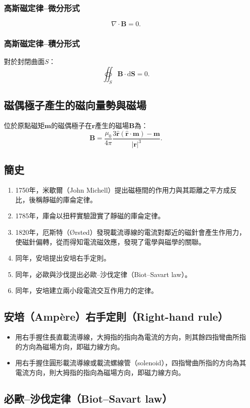 \documentclass[a4paper,12pt]{report}
\begin{document}
\begin{itemize}
\subsubsection{高斯磁定律–微分形式}
\[\nabla \cdot \mathbf{B} = 0.\]
\subsubsection{高斯磁定律–積分形式}
對於封閉曲面$S$：
\[\oiint_S\mathbf{B}\cdot\mathrm{d}\mathbf{S}=0.\]
\subsection{磁偶極子產生的磁向量勢與磁場}
位於原點磁矩$\mathbf{m}$的磁偶極子在$\mathbf{r}$產生的磁場$\mathbf{B}$為：
\[\mathbf{B}=\frac{\mu_0}{4\pi}\frac{3\hat{\mathbf{r}}\left(\hat{\mathbf{r}}\cdot\mathbf{m}\right)-\mathbf{m}}{|\mathbf{r}|^3}.\]
\subsection{簡史}
\begin{enumerate}
\item 1750年，米歇爾（John Michell）提出磁極間的作用力與其距離之平方成反比，後稱靜磁的庫侖定律。
\item 1785年，庫侖以扭秤實驗證實了靜磁的庫侖定律。
\item 1820年，厄斯特（Ørsted）發現載流導線的電流對鄰近的磁針會產生作用力，使磁針偏轉，從而得知電流磁效應，發現了電學與磁學的關聯。
\item 同年，安培提出安培右手定則。
\item 同年，必歐與沙伐提出必歐–沙伐定律（Biot–Savart law）。
\item 同年，安培建立兩小段電流交互作用力的定律。
\end{enumerate}
\subsection{安培（Ampère）右手定則（Right-hand rule）}
\begin{itemize}
\item 用右手握住長直載流導線，大拇指的指向為電流的方向，則其餘四指彎曲所指的方向為磁場方向，即磁力線方向。
\item 用右手握住圓形載流導線或載流螺線管（solenoid），四指彎曲所指的方向為其電流方向，則大拇指的指向為磁場方向，即磁力線方向。
\end{itemize}
\subsection{必歐–沙伐定律（Biot–Savart law）}

\end{itemize}
\end{document}

